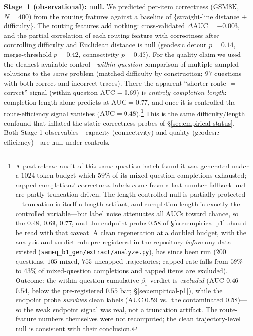 \documentclass{article}
\begin{document}
\medskip
\noindent\textbf{Stage~1 (observational): null.} We predicted per-item correctness (GSM8K, $N=400$)
from the routing features against a baseline of \{straight-line distance $+$ difficulty\}. The routing
features add nothing: cross-validated $\Delta\mathrm{AUC} = -0.003$, and the partial correlation of
each routing feature with correctness after controlling difficulty and Euclidean distance is null
(geodesic detour $p=0.14$, merge-threshold $p=0.42$, connectivity $p=0.43$). For the quality claim we
used the cleanest available control---\emph{within-question} comparison of multiple sampled solutions
to the \emph{same} problem (matched difficulty by construction; $97$ questions with both correct and
incorrect traces). There the apparent ``shorter route $=$ correct'' signal (within-question
$\mathrm{AUC}=0.69$) is \emph{entirely completion length}: completion length alone predicts at
$\mathrm{AUC}=0.77$, and once it is controlled the route-efficiency signal vanishes ($\mathrm{AUC}=0.48$).\footnote{A
post-release audit of this same-question batch found it was generated under a $1024$-token budget
which $59\%$ of its mixed-question completions exhausted; capped completions' correctness labels
come from a last-number fallback and are partly truncation-driven. The length-controlled null is
partially protected---truncation is itself a length artifact, and completion length is exactly the
controlled variable---but label noise attenuates all AUCs toward chance, so the $0.48$, $0.69$,
$0.77$, and the endpoint-probe $0.58$ of \S\ref{sec:empirical-p1} should be read with that caveat.
A clean regeneration at a doubled budget, with the analysis and verdict rule pre-registered in the
repository \emph{before} any data existed (\texttt{sameq\_b1\_gen/extract/analyze.py}), has since
been run ($200$ questions, $105$ mixed, $755$ uncapped trajectories; capped rate falls from
$59\%$ to $43\%$ of mixed-question completions and capped items are excluded). Outcome: the
within-question cumulative-$\beta_1$ verdict is \emph{excluded} (AUC $0.46$--$0.54$, below the
pre-registered $0.55$ bar; \S\ref{sec:empirical-p1}), while the endpoint probe \emph{survives}
clean labels (AUC $0.59$ vs.\ the contaminated $0.58$)---so the weak endpoint signal was real,
not a truncation artifact. The route-feature numbers themselves were not recomputed; the clean
trajectory-level null is consistent with their conclusion.}
This is the same difficulty/length confound that inflated the static correctness probes of
\S\ref{sec:empirical-status}. Both Stage-1 observables---capacity (connectivity) and quality
(geodesic efficiency)---are null under controls.
\end{document}
